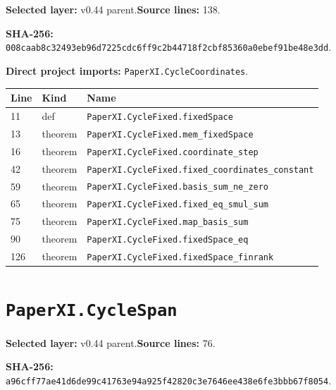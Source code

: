 \documentclass[10pt,oneside]{book}
\begin{document}
\textbf{Selected layer:} v0.44 parent.\quad\textbf{Source lines:} 138.\par\textbf{SHA-256:} {\scriptsize\nolinkurl{008caab8c32493eb96d7225cdc6ff9c2b44718f2cbf85360a0ebef91be48e3dd}}.


\textbf{Direct project imports:} \nolinkurl{PaperXI.CycleCoordinates}.

\begin{longtable}{@{}p{}p{}p{}@{}}\toprule Line&Kind&Name\\\midrule\endhead

11&def&\nolinkurl{PaperXI.CycleFixed.fixedSpace}\\

13&theorem&\nolinkurl{PaperXI.CycleFixed.mem_fixedSpace}\\

16&theorem&\nolinkurl{PaperXI.CycleFixed.coordinate_step}\\

42&theorem&\nolinkurl{PaperXI.CycleFixed.fixed_coordinates_constant}\\

59&theorem&\nolinkurl{PaperXI.CycleFixed.basis_sum_ne_zero}\\

65&theorem&\nolinkurl{PaperXI.CycleFixed.fixed_eq_smul_sum}\\

75&theorem&\nolinkurl{PaperXI.CycleFixed.map_basis_sum}\\

90&theorem&\nolinkurl{PaperXI.CycleFixed.fixedSpace_eq}\\

126&theorem&\nolinkurl{PaperXI.CycleFixed.fixedSpace_finrank}\\

\bottomrule\end{longtable}

\section{\texorpdfstring{\nolinkurl{PaperXI.CycleSpan}}{PaperXI.CycleSpan}}\label{module:PaperXI.CycleSpan}

\textbf{Selected layer:} v0.44 parent.\quad\textbf{Source lines:} 76.\par\textbf{SHA-256:} {\scriptsize\nolinkurl{a96cff77ae41d6de99c41763e94a925f42820c3e7646ee438e6fe3bbb67f8054}}.
\end{document}
